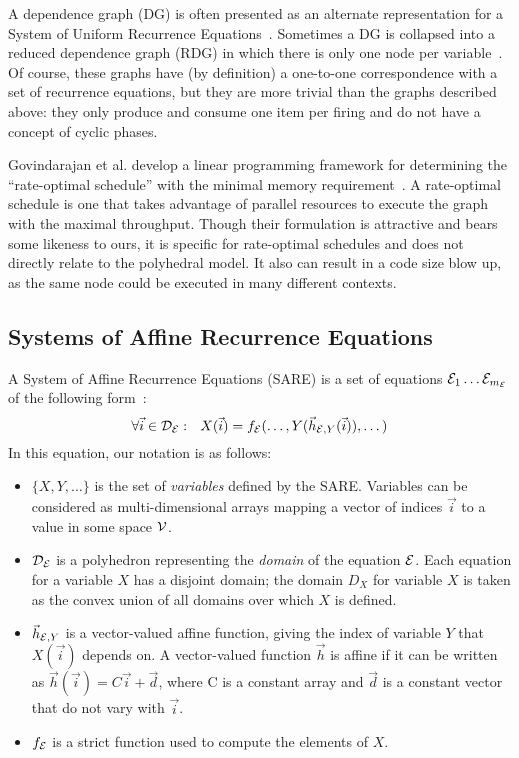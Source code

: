 A dependence graph (DG) is often presented as an alternate
representation for a System of Uniform Recurrence
Equations~\cite{Karp67,DRV00}.  Sometimes a DG is collapsed into a
reduced dependence graph (RDG) in which there is only one node per
variable~\cite{DRV00}.  Of course, these graphs have (by definition) a
one-to-one correspondence with a set of recurrence equations, but they
are more trivial than the graphs described above: they only produce
and consume one item per firing and do not have a concept of
cyclic phases.

Govindarajan et al. develop a linear programming framework for
determining the ``rate-optimal schedule'' with the minimal memory
requirement~\cite{GGD94}.  A rate-optimal schedule is one that takes
advantage of parallel resources to execute the graph with the maximal
throughput.  Though their formulation is attractive and bears some
likeness to ours, it is specific for rate-optimal schedules and does
not directly relate to the polyhedral model.  It also can result in a
code size blow up, as the same node could be executed in many
different contexts.

\subsection{Systems of Affine Recurrence Equations}

A System of Affine Recurrence Equations (SARE) is a set of equations
${\cal E}_1 \dots {\cal E}_{m_{\cal E}}$ of the following
form~\cite{MQRS90,Feautrier92i}:
\begin{equation}
\forall {\vec i} \in {\cal D_{\cal E}}:~~X({\vec i}) = f_{\cal E}(\dots, Y({\vec h}_{{\cal
E}, Y}({\vec i})), \dots)
\label{eq:sare}
\end{equation}
In this equation, our notation is as follows:
\begin{itemize}

\item $\{X, Y, \dots\}$ is the set of {\it variables} defined by the
SARE.  Variables can be considered as multi-dimensional arrays mapping
a vector of indices ${\vec i}$ to a value in some space ${\cal V}$.

\item ${\cal D_{\cal E}}$ is a polyhedron representing the {\it
domain} of the equation ${\cal E}$.  Each equation for a variable $X$
has a disjoint domain; the domain $D_X$ for variable $X$ is taken as
the convex union of all domains over which $X$ is defined.

\item ${\vec h}_{{\cal E}, Y}$ is a vector-valued affine function,
giving the index of variable $Y$ that $X({\vec i})$ depends on.  A
vector-valued function ${\vec h}$ is affine if it can be written as
${\vec h}({\vec i}) = C{\vec i} + {\vec d}$, where C is a constant
array and ${\vec d}$ is a constant vector that do not vary with ${\vec
i}$.

\item $f_{\cal E}$ is a strict function used to compute the elements
of $X$.

\end{itemize}

